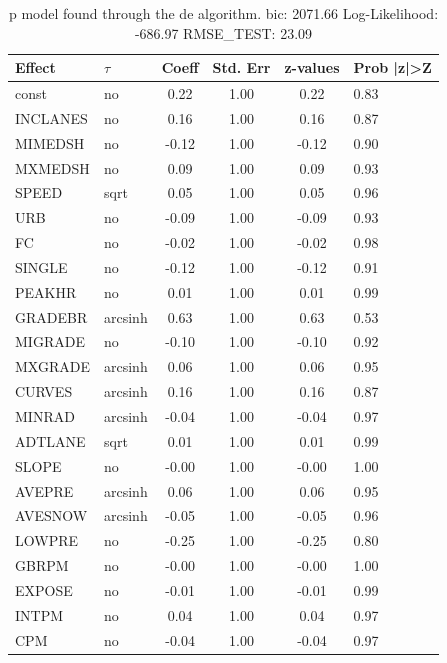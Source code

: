 \begin{table}
	\caption{p model found through the de algorithm. bic: 2071.66 Log-Likelihood: -686.97 RMSE_TEST: 23.09}
	\begin{center}
		\begin{tabular}{|l|l|c|c|c|l|}
			\hline
			Effect & $\tau$ & Coeff & Std. Err & z-values & Prob |z|>Z \\
			\hline
			const & no & 0.22 & 1.00 & 0.22 & 0.83 \\
			\hline
			INCLANES & no & 0.16 & 1.00 & 0.16 & 0.87 \\
			\hline
			MIMEDSH & no & -0.12 & 1.00 & -0.12 & 0.90 \\
			\hline
			MXMEDSH & no & 0.09 & 1.00 & 0.09 & 0.93 \\
			\hline
			SPEED & sqrt & 0.05 & 1.00 & 0.05 & 0.96 \\
			\hline
			URB & no & -0.09 & 1.00 & -0.09 & 0.93 \\
			\hline
			FC & no & -0.02 & 1.00 & -0.02 & 0.98 \\
			\hline
			SINGLE & no & -0.12 & 1.00 & -0.12 & 0.91 \\
			\hline
			PEAKHR & no & 0.01 & 1.00 & 0.01 & 0.99 \\
			\hline
			GRADEBR & arcsinh & 0.63 & 1.00 & 0.63 & 0.53 \\
			\hline
			MIGRADE & no & -0.10 & 1.00 & -0.10 & 0.92 \\
			\hline
			MXGRADE & arcsinh & 0.06 & 1.00 & 0.06 & 0.95 \\
			\hline
			CURVES & arcsinh & 0.16 & 1.00 & 0.16 & 0.87 \\
			\hline
			MINRAD & arcsinh & -0.04 & 1.00 & -0.04 & 0.97 \\
			\hline
			ADTLANE & sqrt & 0.01 & 1.00 & 0.01 & 0.99 \\
			\hline
			SLOPE & no & -0.00 & 1.00 & -0.00 & 1.00 \\
			\hline
			AVEPRE & arcsinh & 0.06 & 1.00 & 0.06 & 0.95 \\
			\hline
			AVESNOW & arcsinh & -0.05 & 1.00 & -0.05 & 0.96 \\
			\hline
			LOWPRE & no & -0.25 & 1.00 & -0.25 & 0.80 \\
			\hline
			GBRPM & no & -0.00 & 1.00 & -0.00 & 1.00 \\
			\hline
			EXPOSE & no & -0.01 & 1.00 & -0.01 & 0.99 \\
			\hline
			INTPM & no & 0.04 & 1.00 & 0.04 & 0.97 \\
			\hline
			CPM & no & -0.04 & 1.00 & -0.04 & 0.97 \\

\end{tabular}
\end{center}
\end{table}
